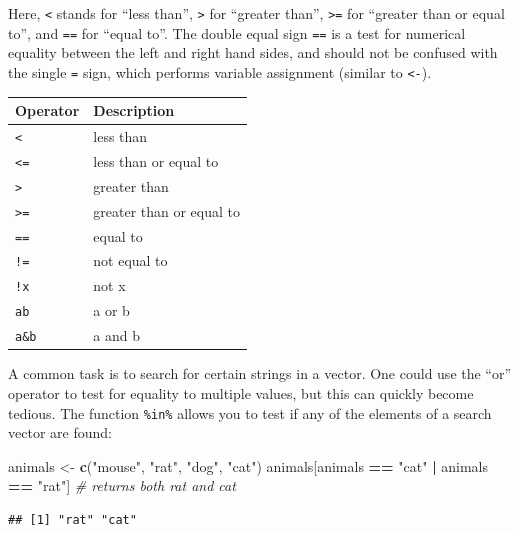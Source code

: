 \documentclass[
]{book}
\newenvironment{Shaded}{\begin{snugshade}}{\end{snugshade}}
\newcommand{\CommentTok}[1]{\textcolor[rgb]{0.56,0.35,0.01}{\textit{#1}}}
\newcommand{\FunctionTok}[1]{\textcolor[rgb]{0.13,0.29,0.53}{\textbf{#1}}}
\newcommand{\NormalTok}[1]{#1}
\newcommand{\OtherTok}[1]{\textcolor[rgb]{0.56,0.35,0.01}{#1}}
\newcommand{\SpecialCharTok}[1]{\textcolor[rgb]{0.81,0.36,0.00}{\textbf{#1}}}
\newcommand{\StringTok}[1]{\textcolor[rgb]{0.31,0.60,0.02}{#1}}
\begin{document}
Here, \texttt{\textless{}} stands for ``less than'', \texttt{\textgreater{}} for ``greater than'', \texttt{\textgreater{}=} for ``greater than or equal to'', and \texttt{==} for ``equal to''. The double equal sign \texttt{==} is a test for numerical equality between the left and right hand sides, and should not be confused with the single \texttt{=} sign, which performs variable assignment (similar to \texttt{\textless{}-}).

\begin{longtable}[]{@{}ll@{}}
\toprule\noalign{}
Operator & Description \\
\midrule\noalign{}
\endhead
\bottomrule\noalign{}
\endlastfoot
\texttt{\textless{}} & less than \\
\texttt{\textless{}=} & less than or equal to \\
\texttt{\textgreater{}} & greater than \\
\texttt{\textgreater{}=} & greater than or equal to \\
\texttt{==} & equal to \\
\texttt{!=} & not equal to \\
\texttt{!x} & not x \\
\texttt{a\textbar{}b} & a or b \\
\texttt{a\&b} & a and b \\
\end{longtable}

A common task is to search for certain strings in a vector. One could use the ``or'' operator \textbar{} to test for equality to multiple values, but this can quickly become tedious. The function \texttt{\%in\%} allows you to test if any of the elements of a search vector are found:

\begin{Shaded}
\begin{Highlighting}[]
\NormalTok{animals }\OtherTok{\textless{}{-}} \FunctionTok{c}\NormalTok{(}\StringTok{"mouse"}\NormalTok{, }\StringTok{"rat"}\NormalTok{, }\StringTok{"dog"}\NormalTok{, }\StringTok{"cat"}\NormalTok{)}
\NormalTok{animals[animals }\SpecialCharTok{==} \StringTok{"cat"} \SpecialCharTok{|}\NormalTok{ animals }\SpecialCharTok{==} \StringTok{"rat"}\NormalTok{] }\CommentTok{\# returns both rat and cat}
\end{Highlighting}
\end{Shaded}

\begin{verbatim}
## [1] "rat" "cat"
\end{verbatim}
\end{document}

